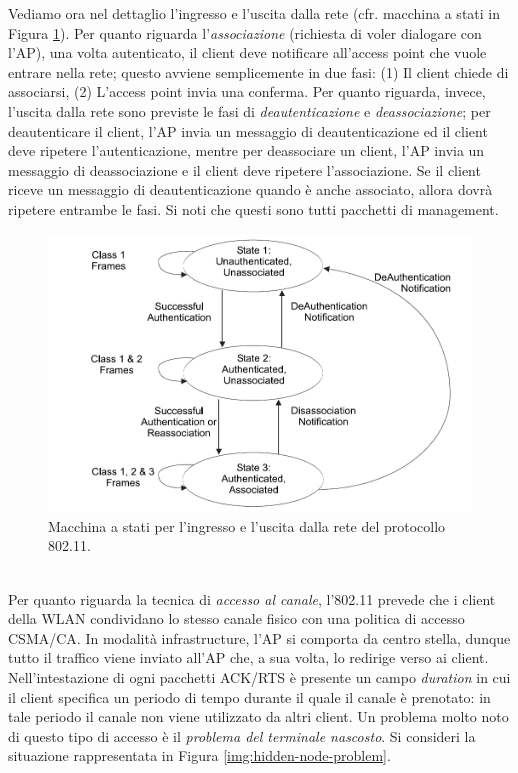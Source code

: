 Vediamo ora nel dettaglio l'ingresso e l'uscita dalla rete (cfr. macchina a stati in Figura \ref{img:802_11-state-machine}). Per quanto riguarda l'\textit{associazione} (richiesta di voler dialogare con l'AP), una volta autenticato, il client deve notificare all'access point che vuole entrare nella rete; questo avviene semplicemente in due fasi: (1) Il client chiede di associarsi, (2) L'access point invia una conferma. Per quanto riguarda, invece, l'uscita dalla rete sono previste le fasi di \textit{deautenticazione} e \textit{deassociazione}; per deautenticare il client, l'AP invia un messaggio di deautenticazione ed il client deve ripetere l'autenticazione, mentre per deassociare un client, l'AP invia un messaggio di deassociazione e il client deve ripetere l'associazione. Se il client riceve un messaggio di deautenticazione quando è anche associato, allora dovrà ripetere entrambe le fasi. Si noti che questi sono tutti pacchetti di management.
\begin{figure}[htbp]
	\centering
	\includegraphics[scale = 0.3]{images/802_11-state-machine}
	\caption{Macchina a stati per l'ingresso e l'uscita dalla rete del protocollo 802.11.}
	\label{img:802_11-state-machine}
\end{figure}\\
Per quanto riguarda la tecnica di \textit{accesso al canale}, l'802.11 prevede che i client della WLAN condividano lo stesso canale fisico con una politica di accesso CSMA/CA. In modalità infrastructure, l'AP si comporta da centro stella, dunque tutto il traffico viene inviato all'AP che, a sua volta, lo redirige verso ai client. Nell'intestazione di ogni pacchetti ACK/RTS è presente un campo \textit{duration} in cui il client specifica un periodo di tempo durante il quale il canale è prenotato: in tale periodo il canale non viene utilizzato da altri client. Un problema molto noto di questo tipo di accesso è il \textit{problema del terminale nascosto}. Si consideri la situazione rappresentata in Figura \ref{img:hidden-node-problem}.
